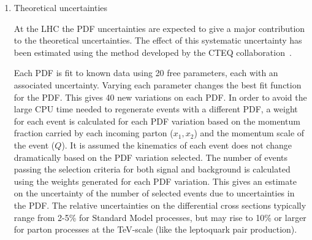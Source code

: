 \begin{enumerate}

\item Theoretical uncertainties 

At the LHC the PDF uncertainties are expected to give a major
contribution to the theoretical uncertainties.  
The effect of this systematic uncertainty has been estimated
using the method developed by the CTEQ collaboration~\cite{PDFRescaling,Martin:2003sk}.

Each PDF is fit to known data using 20 free parameters, each with an associated uncertainty.  
Varying each parameter changes the best fit function for the PDF.  
This gives 40 new variations on each PDF.  
In order to avoid the large CPU time needed to regenerate events with 
a different PDF, a weight for each event is calculated for each PDF variation 
based on the momentum fraction carried by each incoming parton ($x_1, x_2$) 
and the momentum scale of the event ($Q$).  
It is assumed the kinematics of each event does not change dramatically based 
on the PDF variation selected.
The number of events passing the selection criteria for both signal and background 
is calculated using the weights generated for each PDF variation.  
This gives an estimate on the uncertainty of the number of selected events due 
to uncertainties in the PDF.
The relative uncertainties on the differential cross sections 
typically range from 2-5\% for Standard Model processes, 
but may rise to 10\% or larger for parton processes at the TeV-scale 
(like the leptoquark pair production).

\end{enumerate}
%
%
